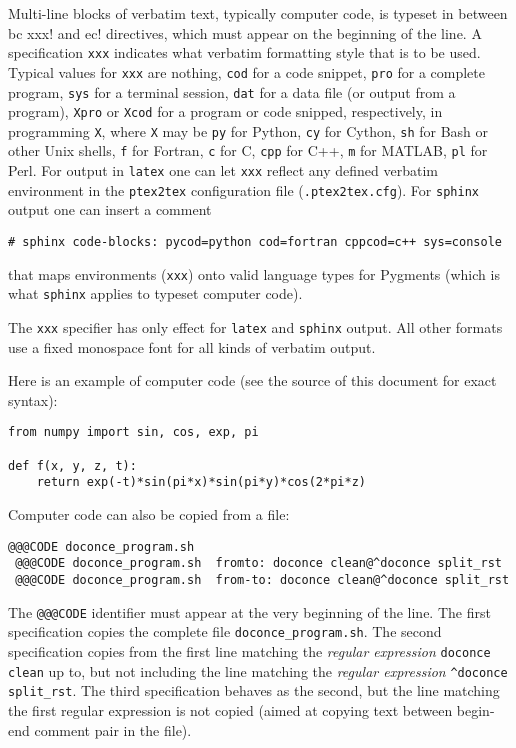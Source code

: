 \documentclass[%
oneside,                 %
final,                   %
10pt]{article}
\begin{document}
Multi-line blocks of verbatim text, typically computer code, is typeset
in between \Verb!!bc xxx! and \Verb!!ec! directives, which must appear on the
beginning of the line. A specification \Verb!xxx! indicates what verbatim
formatting style that is to be used. Typical values for \Verb!xxx! are
nothing, \Verb!cod! for a code snippet, \Verb!pro! for a complete program,
\Verb!sys! for a terminal session, \Verb!dat! for a data file (or output from a
program),
\Verb!Xpro! or \Verb!Xcod! for a program or code snipped, respectively,
in programming \Verb!X!, where \Verb!X! may be \Verb!py! for Python,
\Verb!cy! for Cython, \Verb!sh! for Bash or other Unix shells,
\Verb!f! for Fortran, \Verb!c! for C, \Verb!cpp! for C++, \Verb!m! for MATLAB,
\Verb!pl! for Perl. For output in \Verb!latex! one can let \Verb!xxx! reflect any
defined verbatim environment in the \Verb!ptex2tex! configuration file
(\Verb!.ptex2tex.cfg!). For \Verb!sphinx! output one can insert a comment
\begin{Verbatim}[numbers=none,fontsize=\fontsize{9pt}{9pt},baselinestretch=0.85,xleftmargin=0mm]
# sphinx code-blocks: pycod=python cod=fortran cppcod=c++ sys=console
\end{Verbatim}
that maps environments (\Verb!xxx!) onto valid language types for
Pygments (which is what \Verb!sphinx! applies to typeset computer code).

The \Verb!xxx! specifier has only effect for \Verb!latex! and
\Verb!sphinx! output. All other formats use a fixed monospace font for all
kinds of verbatim output.

Here is an example of computer code (see the source of this document
for exact syntax):

\begin{Verbatim}[numbers=none,fontsize=\fontsize{9pt}{9pt},baselinestretch=0.85,xleftmargin=0mm]
from numpy import sin, cos, exp, pi

def f(x, y, z, t):
    return exp(-t)*sin(pi*x)*sin(pi*y)*cos(2*pi*z)
\end{Verbatim}

Computer code can also be copied from a file:
\begin{Verbatim}[numbers=none,fontsize=\fontsize{9pt}{9pt},baselinestretch=0.85,xleftmargin=0mm]
 @@@CODE doconce_program.sh
 @@@CODE doconce_program.sh  fromto: doconce clean@^doconce split_rst
 @@@CODE doconce_program.sh  from-to: doconce clean@^doconce split_rst
\end{Verbatim}
The \Verb!@@@CODE! identifier must appear at the very beginning of the line.
The first specification copies the complete file \Verb!doconce_program.sh!.
The second specification copies from the first line matching the \emph{regular
expression} \Verb!doconce clean! up to, but not including the line
matching the \emph{regular expression} \Verb!^doconce split_rst!.
The third specification behaves as the second, but the line matching
the first regular expression is not copied (aimed at copying
text between begin-end comment pair in the file).
\end{document}
